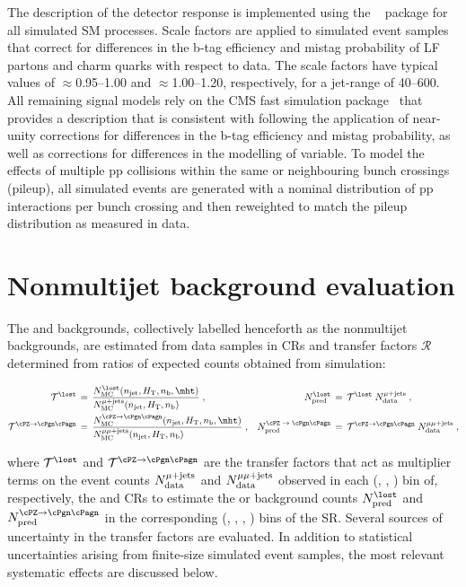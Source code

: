 The description of the detector response is implemented using the
\GEANTfour~\cite{geant} package for all simulated SM processes. Scale
factors are applied to simulated event samples that correct for
differences in the b-tag efficiency and mistag probability of LF
partons and charm quarks with respect to data. The scale factors have
typical values of ${\approx}$0.95--1.00 and ${\approx}$1.00--1.20,
respectively, for a jet-\pt range of 40--600\GeV. All remaining signal
models rely on the CMS fast simulation package~\cite{fastsim} that
provides a description that is consistent with \GEANTfour following
the application of near-unity corrections for differences in the b-tag
efficiency and mistag probability, as well as corrections for
differences in the modelling of \mht variable. To model the effects of
multiple pp collisions within the same or neighbouring bunch crossings
(pileup), all simulated events are generated with a nominal
distribution of pp interactions per bunch crossing and then reweighted
to match the pileup distribution as measured in data.


\section{Nonmultijet background evaluation}
\label{sec:ewk}

The \lost and \znunuj backgrounds, collectively labelled henceforth as
the nonmultijet backgrounds, are estimated from data samples in CRs
and transfer factors $\mathcal{R}$ determined from ratios of expected
counts obtained from simulation:

\begin{align}
  \tf^{\lost} \, & = \,
  \frac{N^{\lost}_\text{MC}(\njet, \scalht, \nb, \mht)}
  {N^{\mj}_\text{MC}(\njet, \scalht, \nb)\hfill} \; ,
  & 
  N^{\lost}_\text{pred} \, & = \,
  \tf^{\lost} \; N^{\mj}_\text{data} \; ,
  \\
  \tf^{\znunu} \, & = \,
  \frac{N^{\znunu}_\text{MC}(\njet, \scalht, \nb, \mht)}
  {N^{\mmj}_\text{MC}(\njet, \scalht, \nb)\hfill} \; ,
  & 
  N^\text{\znunu}_\text{pred} \, & = \,
  \tf^{\znunu} \; N^{\mmj}_\text{data} \; ,
\end{align}

where $\tf^{\lost}$ and $\tf^{\znunu}$ are the transfer factors that
act as multiplier terms on the event counts $N^{\mu + \text{jets}}_\text{data}$ and
$N^{\mu\mu + \text{jets}}_\text{data}$ observed in each (\njet, \scalht, \nb) bin of,
respectively, the \mj and \mmj CRs to estimate the \lost or \znunuj
background counts $N^{\lost}_\text{pred}$ and $N^{\znunu}_\text{pred}$
in the corresponding (\njet, \scalht, \nb, \mht) bins of the
SR. Several sources of uncertainty in the transfer factors are
evaluated.  In addition to statistical uncertainties arising from
finite-size simulated event samples, the most relevant systematic
effects are discussed below.

